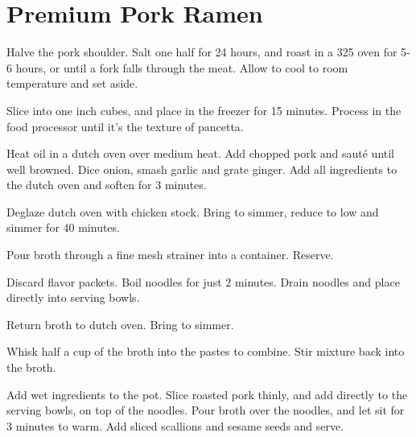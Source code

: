 \section{Premium Pork Ramen}
\begin{recipe}



Halve the pork shoulder. Salt one half for 24 hours, and roast in a 325\degree
oven for 5-6 hours, or until a fork falls through the meat. Allow to cool
to room temperature and set aside.


Slice into one inch cubes, and place in the freezer for 15 minutes. Process in
the food processor until it's the texture of pancetta.


Heat oil in a dutch oven over medium heat. Add chopped pork and sauté until
well browned. Dice onion, smash garlic and grate ginger. Add all ingredients
to the dutch oven and soften for 3 minutes.


Deglaze dutch oven with chicken stock. Bring to simmer, reduce to low and
simmer for 40 minutes.

Pour broth through a fine mesh strainer into a container. Reserve.


Discard flavor packets. Boil noodles for just 2 minutes. Drain noodles and
place directly into serving bowls.

Return broth to dutch oven. Bring to simmer.


Whisk half a cup of the broth into the pastes to combine. Stir mixture back
into the broth.


Add wet ingredients to the pot. Slice roasted pork thinly, and add directly to
the serving bowls, on top of the noodles. Pour broth over the noodles, and
let sit for 3 minutes to warm. Add sliced scallions and sesame seeds and serve.

\end{recipe}
